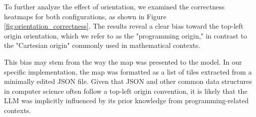 To further analyze the effect of orientation, we examined the correctness heatmaps
for both configurations, as shown in Figure \ref{fig:orientation_correctness}. The
results reveal a clear bias toward the top-left origin orientation, which we
refer to as the "programming origin," in contrast to the "Cartesian origin" commonly
used in mathematical contexts.

This bias may stem from the way the map was presented to the model. In our
specific implementation, the map was formatted as a list of tiles extracted from
a minimally edited JSON file. Given that JSON and other common data structures
in computer science often follow a top-left origin convention, it is likely that
the LLM was implicitly influenced by its prior knowledge from programming-related
contexts.

\vspace{5mm}
